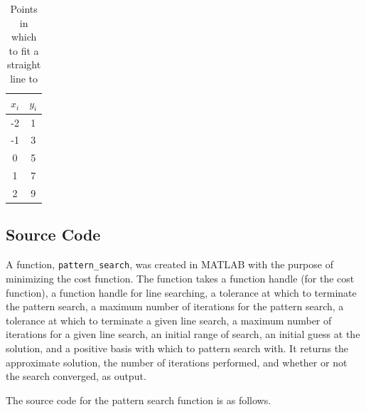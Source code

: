 \documentclass{article}
\begin{document}
\begin{table}
\centering
\begin{tabular}{| c | c |}
	\hline
	$x_i$ & $y_i$ \\ \hline
	-2  & 1	  \\
	-1  & 3   \\
	0   & 5   \\
	1   & 7   \\
	2   & 9 \\
	\hline
\end{tabular}
\caption{Points in which to fit a straight line to}
\label{table:points}
\end{table}

\subsection{Source Code}

A function, \texttt{pattern\_search}, was created in MATLAB with the purpose of minimizing the cost function.
The function takes a function handle (for the cost function), a function handle for line searching, a tolerance at which to terminate the pattern search, a maximum number of iterations for the pattern search, a tolerance at which to terminate a given line search, a maximum number of iterations for a given line search, an initial range of search, an initial guess at the solution, and a positive basis with which to pattern search with.
It returns the approximate solution, the number of iterations performed, and whether or not the search converged, as output.

The source code for the pattern search function is as follows.
\end{document}
